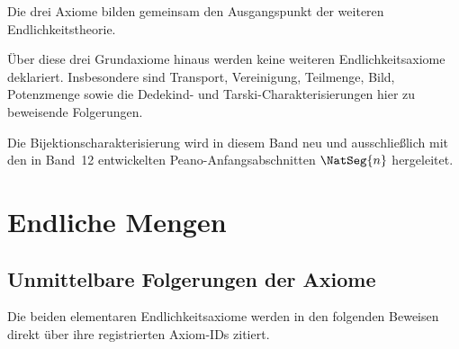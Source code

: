 \documentclass[main.tex]{subfiles}
\begin{document}
Die drei Axiome bilden gemeinsam den Ausgangspunkt der weiteren
Endlichkeitstheorie.


Über diese drei Grundaxiome hinaus werden keine weiteren
Endlichkeitsaxiome deklariert. Insbesondere sind Transport, Vereinigung,
Teilmenge, Bild, Potenzmenge sowie die Dedekind- und
Tarski-Charakterisierungen hier zu beweisende Folgerungen.

Die Bijektionscharakterisierung wird in diesem Band neu und ausschließlich mit
den in Band~12 entwickelten Peano-Anfangsabschnitten \(\NatSeg{n}\)
hergeleitet.

\chapter{Endliche Mengen}

\section{Unmittelbare Folgerungen der Axiome}

Die beiden elementaren Endlichkeitsaxiome werden in den folgenden Beweisen
direkt über ihre registrierten Axiom-IDs zitiert.

\begin{tabproof}
\end{tabproof}
\end{document}
